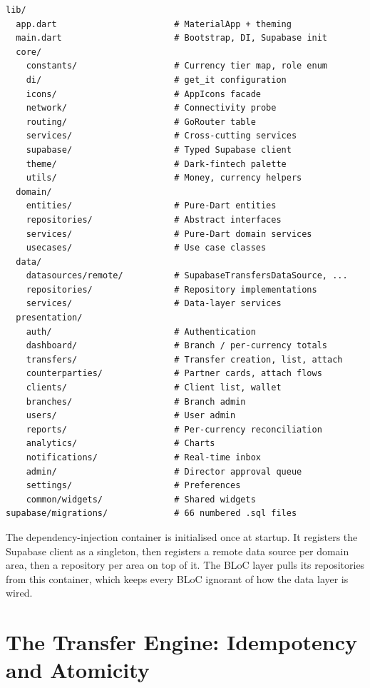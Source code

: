 \begin{lstlisting}[caption={Source tree (abridged)},label={lst:tree}]
lib/
  app.dart                       # MaterialApp + theming
  main.dart                      # Bootstrap, DI, Supabase init
  core/
    constants/                   # Currency tier map, role enum
    di/                          # get_it configuration
    icons/                       # AppIcons facade
    network/                     # Connectivity probe
    routing/                     # GoRouter table
    services/                    # Cross-cutting services
    supabase/                    # Typed Supabase client
    theme/                       # Dark-fintech palette
    utils/                       # Money, currency helpers
  domain/
    entities/                    # Pure-Dart entities
    repositories/                # Abstract interfaces
    services/                    # Pure-Dart domain services
    usecases/                    # Use case classes
  data/
    datasources/remote/          # SupabaseTransfersDataSource, ...
    repositories/                # Repository implementations
    services/                    # Data-layer services
  presentation/
    auth/                        # Authentication
    dashboard/                   # Branch / per-currency totals
    transfers/                   # Transfer creation, list, attach
    counterparties/              # Partner cards, attach flows
    clients/                     # Client list, wallet
    branches/                    # Branch admin
    users/                       # User admin
    reports/                     # Per-currency reconciliation
    analytics/                   # Charts
    notifications/               # Real-time inbox
    admin/                       # Director approval queue
    settings/                    # Preferences
    common/widgets/              # Shared widgets
supabase/migrations/             # 66 numbered .sql files
\end{lstlisting}

The dependency-injection container is initialised once at startup. It registers the Supabase client as a singleton, then registers a remote data source per domain area, then a repository per area on top of it. The BLoC layer pulls its repositories from this container, which keeps every BLoC ignorant of how the data layer is wired.

\section{The Transfer Engine: Idempotency and Atomicity}
\label{sec:transfer}

